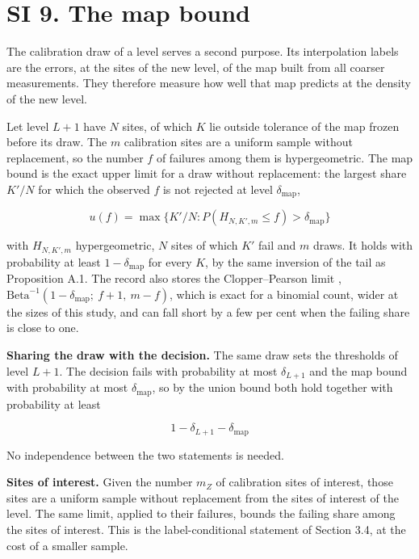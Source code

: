\documentclass{iopjournal}
\begin{document}
\hypertarget{si-9.-the-map-bound}{%
\section*{SI 9. The map bound}\label{si-9.-the-map-bound}}

The calibration draw of a level serves a second purpose. Its interpolation labels are the errors, at the sites of the new level, of the map built from all coarser measurements. They therefore measure how well that map predicts at the density of the new level.

Let level \(L + 1\) have \(N\) sites, of which \(K\) lie outside tolerance of the map frozen before its draw. The \(m\) calibration sites are a uniform sample without replacement, so the number \(f\) of failures among them is hypergeometric. The map bound is the exact upper limit for a draw without replacement: the largest share \(K'/N\) for which the observed \(f\) is not rejected at level \(\delta_{\mathrm{map}}\),

\[
u(f) = \max \{ K'/N : P(H_{N, K', m} \le f) > \delta_{\mathrm{map}} \}
\]

with \(H_{N, K', m}\) hypergeometric, \(N\) sites of which \(K'\) fail and \(m\) draws. It holds with probability at least \(1 - \delta_{\mathrm{map}}\) for every \(K\), by the same inversion of the tail as Proposition A.1. The record also stores the Clopper--Pearson limit \cite{ClopperPearson1934}, \(\mathrm{Beta}^{-1}(1 - \delta_{\mathrm{map}};\ f + 1,\ m - f)\), which is exact for a binomial count, wider at the sizes of this study, and can fall short by a few per cent when the failing share is close to one.

\textbf{Sharing the draw with the decision.} The same draw sets the thresholds of level \(L + 1\). The decision fails with probability at most \(\delta_{L+1}\) and the map bound with probability at most \(\delta_{\mathrm{map}}\), so by the union bound both hold together with probability at least

\[
1 - \delta_{L+1} - \delta_{\mathrm{map}}
\]

No independence between the two statements is needed.

\textbf{Sites of interest.} Given the number \(m_Z\) of calibration sites of interest, those sites are a uniform sample without replacement from the sites of interest of the level. The same limit, applied to their failures, bounds the failing share among the sites of interest. This is the label-conditional statement of Section 3.4, at the cost of a smaller sample.
\end{document}
